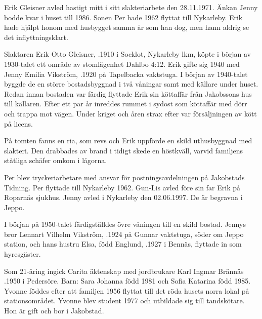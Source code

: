 %
Erik Gleisner avled hastigt mitt i sitt slakteriarbete den 28.11.1971. Änkan Jenny bodde kvar i huset till 1986. Sonen Per hade 1962 flyttat till Nykarleby. Erik hade hjälpt honom med husbygget samma år som han dog, men hann aldrig se det inflyttningsklart.


%
Slaktaren Erik Otto Gleisner, .1910 i Socklot, Nykarleby lkm, köpte i början av 1930-talet ett område av stomlägenhet Dahlbo 4:12. Erik gifte sig 1940 med Jenny Emilia Vikström, .1920	på Tapelbacka vaktstuga. I början av 1940-talet byggde de en större bostadsbyggnad i två våningar samt med källare under huset. Redan innan bostaden var färdig flyttade Erik sin köttaffär från Jakobssons hus till källaren. Efter ett par år inreddes rummet i sydost som köttaffär med dörr och trappa mot vägen. Under kriget och åren strax efter var försäljningen av kött på licens.

På tomten fanns en ria, som revs och Erik uppförde en skild uthusbyggnad med slakteri. Den drabbades av brand i tidigt skede en höstkväll, varvid familjens ståtliga schäfer omkom i lågorna.
\begin{jhchildren}
  \item {}
  \item {}
\end{jhchildren}
Per blev tryckeriarbetare med ansvar för postningsavdelningen på 	Jakobstads Tidning. Per flyttade till Nykarleby 1962. Gun-Lis avled före sin far Erik på Roparnäs sjukhus. Jenny avled i Nykarleby den 02.06.1997. De är begravna i Jeppo.


I början på 1950-talet färdigställdes övre våningen till en skild bostad.	Jennys bror Lennart Vilhelm Vikström, .1924 på Gunnar vaktstuga, söder om Jeppo station, och hans hustru Elsa, född Englund, .1927 i Bennäs, flyttade in som hyresgäster.
\begin{jhchildren}
  \item {}
  \item {}
\end{jhchildren}
Som 21-åring ingick Carita äktenskap med	jordbrukare Karl Ingmar Brännäs .1950 i Pedersöre. Barn: Sara Johanna född 1981 och Sofia Katarina född 1985. Yvonne föddes efter att familjen 1956 flyttat till det röda husets norra lokal på stationsområdet. Yvonne blev student 1977 och utbildade sig till tandskötare. Hon är gift och bor i	Jakobstad.


